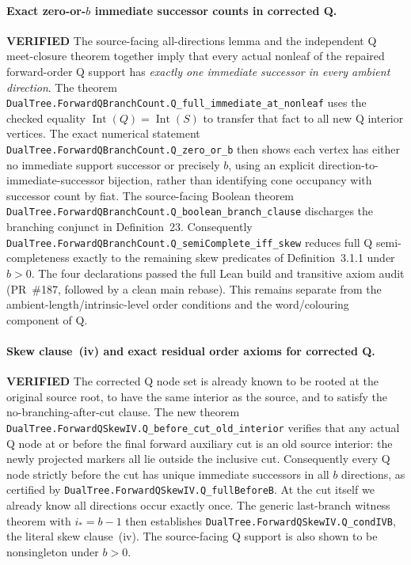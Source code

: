\documentclass[11pt]{article}
\newcommand{\ok}{\textcolor{green!40!black}{\textbf{VERIFIED}}}
\newcommand{\lean}[1]{\texttt{#1}}
\begin{document}
\paragraph{Exact zero-or-$b$ immediate successor counts in corrected Q.} \ok
The source-facing all-directions lemma and the independent
Q meet-closure theorem together imply that every actual
nonleaf of the repaired forward-order Q support has
\emph{exactly one immediate successor in every ambient
direction}. The theorem
\lean{DualTree.ForwardQBranchCount.Q_full_immediate_at_nonleaf}
uses the checked equality $\operatorname{Int}(Q)=
\operatorname{Int}(S)$ to transfer that fact to
all new Q interior vertices.
The exact numerical statement
\lean{DualTree.ForwardQBranchCount.Q_zero_or_b}
then shows each vertex has either no immediate
support successor or precisely $b$, using
an explicit direction-to-immediate-successor
bijection, rather than identifying cone occupancy
with successor count by fiat.
The source-facing Boolean theorem
\lean{DualTree.ForwardQBranchCount.Q_boolean_branch_clause}
discharges the branching conjunct in Definition~23.
Consequently
\lean{DualTree.ForwardQBranchCount.Q_semiComplete_iff_skew}
reduces full Q semi-completeness exactly to the
remaining skew predicates of Definition~3.1.1
under $b>0$.
The four declarations passed the full Lean build and transitive
axiom audit (PR~\#187, followed by a clean main rebase). This remains separate
from the ambient-length/intrinsic-level order
conditions and the word/colouring component of Q.

\paragraph{Skew clause~(iv) and exact residual order axioms for corrected Q.} \ok
The corrected Q node set is already known to be rooted at
the original source root, to have the same interior as the
source, and to satisfy the no-branching-after-cut clause.
The new theorem
\lean{DualTree.ForwardQSkewIV.Q_before_cut_old_interior}
verifies that any actual Q node at or before the final
forward auxiliary cut is an old source interior: the newly
projected markers all lie outside the inclusive cut.
Consequently every Q node strictly before the cut has
unique immediate successors in all $b$ directions, as
certified by
\lean{DualTree.ForwardQSkewIV.Q_fullBeforeB}.
At the cut itself we already know all directions occur
exactly once. The generic last-branch witness theorem
with $i_*=b-1$ then establishes
\lean{DualTree.ForwardQSkewIV.Q_condIVB}, the literal
skew clause~(iv). The source-facing Q support is also
shown to be nonsingleton under $b>0$.
\end{document}
